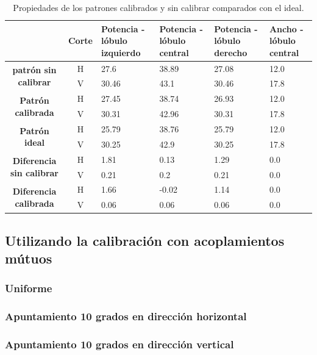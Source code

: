 \begin{table}[H]
  \footnotesize
  \centering
  \begin{tabular}{|c|c|p{2cm}|p{2cm}|p{2cm}|p{2cm}|}
    \cline{2-6}
    \multicolumn{1}{c|}{} & \textbf{Corte} & \textbf{Potencia - lóbulo izquierdo} & \textbf{Potencia - lóbulo central} &
    \textbf{Potencia - lóbulo derecho} & \textbf{Ancho - lóbulo central} \tabularnewline\hline
    \multirow{2}{*}{\textbf{patrón sin calibrar}} & H & 27.6 & 38.89 & 27.08 & 12.0 \tabularnewline\cline{2-6}
     & V & 30.46 & 43.1 & 30.46 & 17.8 \tabularnewline\hline
    \multirow{2}{*}{\textbf{Patrón calibrada}} & H & 27.45 & 38.74 & 26.93 & 12.0 \tabularnewline\cline{2-6}
     & V & 30.31 & 42.96 & 30.31 & 17.8 \tabularnewline\hline
    \multirow{2}{*}{\textbf{Patrón ideal}} & H & 25.79 & 38.76 & 25.79 & 12.0 \tabularnewline\cline{2-6}
     & V & 30.25 & 42.9 & 30.25 & 17.8 \tabularnewline\hline
    \multirow{2}{*}{\textbf{Diferencia sin calibrar}} & H & 1.81 & 0.13 & 1.29 & 0.0\tabularnewline\cline{2-6}
     & V & 0.21 & 0.2 & 0.21 & 0.0 \tabularnewline\hline
    \multirow{2}{*}{\textbf{Diferencia calibrada}} & H & 1.66 & -0.02 & 1.14 & 0.0 \tabularnewline\cline{2-6}
     & V & 0.06 & 0.06 & 0.06 & 0.0 \tabularnewline\hline
  \end{tabular}
  \caption{Propiedades de los patrones calibrados y sin calibrar comparados con el ideal.}
  \label{tab:deadTRMsClassical10degRow}
\end{table}



\subsection{Utilizando la calibración con acoplamientos mútuos}

\subsubsection{Uniforme}

\subsubsection{Apuntamiento 10 grados en dirección horizontal}

\subsubsection{Apuntamiento 10 grados en dirección vertical}


